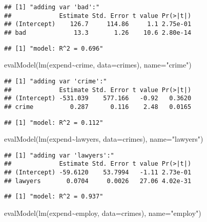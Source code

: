 \documentclass[
  11pt,
]{article}
\newenvironment{Shaded}{\begin{snugshade}}{\end{snugshade}}
\newcommand{\AttributeTok}[1]{\textcolor[rgb]{0.77,0.63,0.00}{#1}}
\newcommand{\FunctionTok}[1]{\textcolor[rgb]{0.00,0.00,0.00}{#1}}
\newcommand{\NormalTok}[1]{#1}
\newcommand{\SpecialCharTok}[1]{\textcolor[rgb]{0.00,0.00,0.00}{#1}}
\newcommand{\StringTok}[1]{\textcolor[rgb]{0.31,0.60,0.02}{#1}}
\begin{document}
\begin{verbatim}
## [1] "adding var 'bad':"
##             Estimate Std. Error t value Pr(>|t|)
## (Intercept)    126.7     114.86     1.1 2.75e-01
## bad             13.3       1.26    10.6 2.80e-14
\end{verbatim}

\begin{verbatim}
## [1] "model: R^2 = 0.696"
\end{verbatim}

\begin{Shaded}
\begin{Highlighting}[]
\FunctionTok{evalModel}\NormalTok{(}\FunctionTok{lm}\NormalTok{(expend}\SpecialCharTok{\textasciitilde{}}\NormalTok{crime, }\AttributeTok{data=}\NormalTok{crimes), }\AttributeTok{name=}\StringTok{"crime"}\NormalTok{)}
\end{Highlighting}
\end{Shaded}

\begin{verbatim}
## [1] "adding var 'crime':"
##             Estimate Std. Error t value Pr(>|t|)
## (Intercept) -531.039    577.166   -0.92   0.3620
## crime          0.287      0.116    2.48   0.0165
\end{verbatim}

\begin{verbatim}
## [1] "model: R^2 = 0.112"
\end{verbatim}

\begin{Shaded}
\begin{Highlighting}[]
\FunctionTok{evalModel}\NormalTok{(}\FunctionTok{lm}\NormalTok{(expend}\SpecialCharTok{\textasciitilde{}}\NormalTok{lawyers, }\AttributeTok{data=}\NormalTok{crimes), }\AttributeTok{name=}\StringTok{"lawyers"}\NormalTok{)}
\end{Highlighting}
\end{Shaded}

\begin{verbatim}
## [1] "adding var 'lawyers':"
##             Estimate Std. Error t value Pr(>|t|)
## (Intercept) -59.6120    53.7994   -1.11 2.73e-01
## lawyers       0.0704     0.0026   27.06 4.02e-31
\end{verbatim}

\begin{verbatim}
## [1] "model: R^2 = 0.937"
\end{verbatim}

\begin{Shaded}
\begin{Highlighting}[]
\FunctionTok{evalModel}\NormalTok{(}\FunctionTok{lm}\NormalTok{(expend}\SpecialCharTok{\textasciitilde{}}\NormalTok{employ, }\AttributeTok{data=}\NormalTok{crimes), }\AttributeTok{name=}\StringTok{"employ"}\NormalTok{)}
\end{Highlighting}
\end{Shaded}
\end{document}
